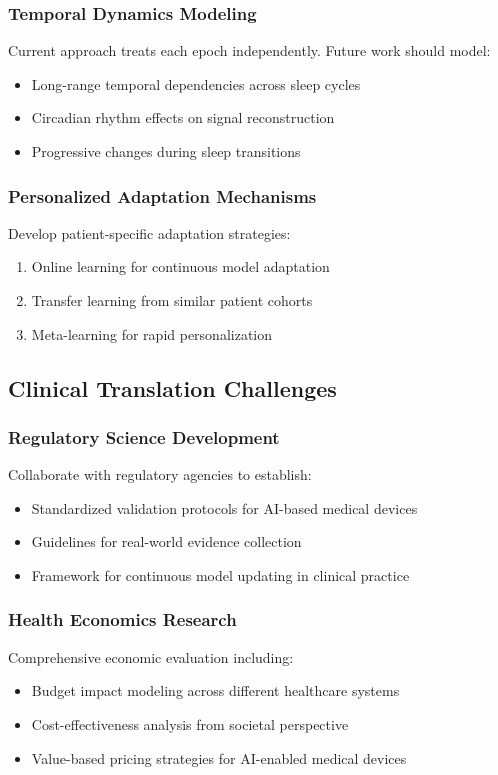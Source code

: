 \documentclass[11pt]{article}
\begin{document}
\subsubsection{Temporal Dynamics Modeling}
Current approach treats each epoch independently. Future work should model:
\begin{itemize}
    \item Long-range temporal dependencies across sleep cycles
    \item Circadian rhythm effects on signal reconstruction
    \item Progressive changes during sleep transitions
\end{itemize}

\subsubsection{Personalized Adaptation Mechanisms}
Develop patient-specific adaptation strategies:
\begin{enumerate}
    \item Online learning for continuous model adaptation
    \item Transfer learning from similar patient cohorts
    \item Meta-learning for rapid personalization
\end{enumerate}

\subsection{Clinical Translation Challenges}

\subsubsection{Regulatory Science Development}
Collaborate with regulatory agencies to establish:
\begin{itemize}
    \item Standardized validation protocols for AI-based medical devices
    \item Guidelines for real-world evidence collection
    \item Framework for continuous model updating in clinical practice
\end{itemize}

\subsubsection{Health Economics Research}
Comprehensive economic evaluation including:
\begin{itemize}
    \item Budget impact modeling across different healthcare systems
    \item Cost-effectiveness analysis from societal perspective
    \item Value-based pricing strategies for AI-enabled medical devices
\end{itemize}
\end{document}
